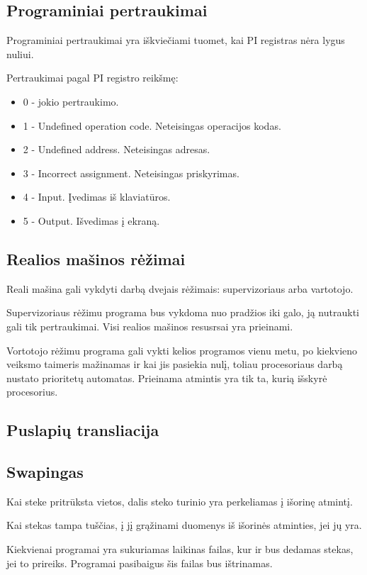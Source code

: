 	\subsection{Programiniai pertraukimai}
	Programiniai pertraukimai yra iškviečiami tuomet, kai PI registras nėra lygus nuliui.
	
	Pertraukimai pagal PI registro reikšmę:
	\begin{itemize}
	\item 0 - jokio pertraukimo.
	\item 1 - Undefined operation code. Neteisingas operacijos kodas.
	\item 2 - Undefined address. Neteisingas adresas.
	\item 3 - Incorrect assignment. Neteisingas priskyrimas.
	\item 4 - Input. Įvedimas iš klaviatūros.
	\item 5 - Output. Išvedimas į ekraną.
	\end{itemize}
	
	\subsection{Realios mašinos rėžimai}
	Reali mašina gali vykdyti darbą dvejais rėžimais: supervizoriaus arba vartotojo. 
	
	Supervizoriaus rėžimu programa bus vykdoma nuo pradžios iki galo, ją nutraukti gali tik pertraukimai. Visi realios mašinos resusrsai yra prieinami.
	
	Vortotojo rėžimu programa gali vykti kelios programos vienu metu, po kiekvieno veiksmo taimeris mažinamas ir kai jis pasiekia nulį, toliau procesoriaus darbą nustato prioritetų automatas. Prieinama atmintis yra tik ta, kurią išskyrė procesorius.
	
	\subsection{Puslapių transliacija}
	
	\subsection{Swapingas}
	Kai steke pritrūksta vietos, dalis steko turinio yra perkeliamas į išorinę atmintį.
	
	Kai stekas tampa tuščias, į jį grąžinami duomenys iš išorinės atminties, jei jų yra.
	
	Kiekvienai programai yra sukuriamas laikinas failas, kur ir bus dedamas stekas, jei to prireiks. Programai pasibaigus šis failas bus ištrinamas.
	
